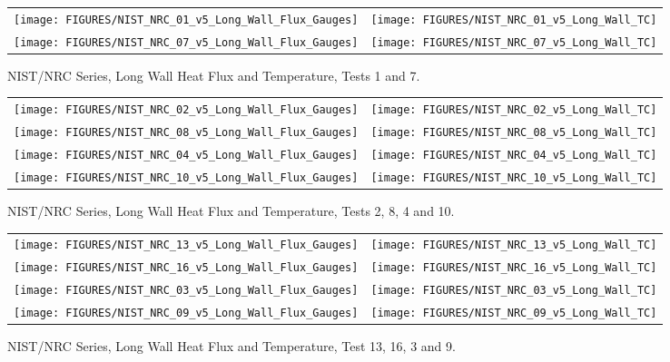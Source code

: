 \vspace{2in}


\begin{figure}[h!]
\begin{tabular*}{\textwidth}{l@{\extracolsep{\fill}}r}
\texttt{[image: FIGURES/NIST\_NRC\_01\_v5\_Long\_Wall\_Flux\_Gauges]} &
\texttt{[image: FIGURES/NIST\_NRC\_01\_v5\_Long\_Wall\_TC]} \\
\texttt{[image: FIGURES/NIST\_NRC\_07\_v5\_Long\_Wall\_Flux\_Gauges]} &
\texttt{[image: FIGURES/NIST\_NRC\_07\_v5\_Long\_Wall\_TC]}

\end{tabular*}
\caption{NIST/NRC Series, Long Wall Heat Flux and Temperature, Tests 1 and 7.}
\label{NIST_NRC_Long_1}
\end{figure}

\begin{figure}[p]
\begin{tabular*}{\textwidth}{l@{\extracolsep{\fill}}r}
\texttt{[image: FIGURES/NIST\_NRC\_02\_v5\_Long\_Wall\_Flux\_Gauges]} &
\texttt{[image: FIGURES/NIST\_NRC\_02\_v5\_Long\_Wall\_TC]} \\
\texttt{[image: FIGURES/NIST\_NRC\_08\_v5\_Long\_Wall\_Flux\_Gauges]} &
\texttt{[image: FIGURES/NIST\_NRC\_08\_v5\_Long\_Wall\_TC]} \\
\texttt{[image: FIGURES/NIST\_NRC\_04\_v5\_Long\_Wall\_Flux\_Gauges]} &
\texttt{[image: FIGURES/NIST\_NRC\_04\_v5\_Long\_Wall\_TC]} \\
\texttt{[image: FIGURES/NIST\_NRC\_10\_v5\_Long\_Wall\_Flux\_Gauges]} &
\texttt{[image: FIGURES/NIST\_NRC\_10\_v5\_Long\_Wall\_TC]}

\end{tabular*}
\caption{NIST/NRC Series, Long Wall Heat Flux and Temperature, Tests 2, 8, 4 and 10.}
\label{NIST_NRC_Long_2}
\end{figure}

\begin{figure}[p]
\begin{tabular*}{\textwidth}{l@{\extracolsep{\fill}}r}
\texttt{[image: FIGURES/NIST\_NRC\_13\_v5\_Long\_Wall\_Flux\_Gauges]} &
\texttt{[image: FIGURES/NIST\_NRC\_13\_v5\_Long\_Wall\_TC]} \\
\texttt{[image: FIGURES/NIST\_NRC\_16\_v5\_Long\_Wall\_Flux\_Gauges]} &
\texttt{[image: FIGURES/NIST\_NRC\_16\_v5\_Long\_Wall\_TC]} \\
\texttt{[image: FIGURES/NIST\_NRC\_03\_v5\_Long\_Wall\_Flux\_Gauges]} &
\texttt{[image: FIGURES/NIST\_NRC\_03\_v5\_Long\_Wall\_TC]} \\
\texttt{[image: FIGURES/NIST\_NRC\_09\_v5\_Long\_Wall\_Flux\_Gauges]} &
\texttt{[image: FIGURES/NIST\_NRC\_09\_v5\_Long\_Wall\_TC]}

\end{tabular*}
\caption{NIST/NRC Series, Long Wall Heat Flux and Temperature, Test 13, 16, 3 and 9.}
\label{NIST_NRC_Long_3}
\end{figure}

